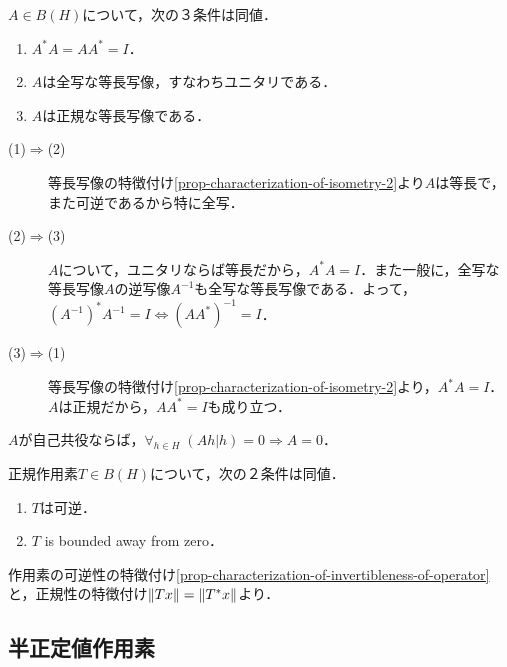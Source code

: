 \documentclass[uplatex,dvipdfmx]{jsreport}
\begin{document}
\begin{proposition}[同型の特徴付け]
    $A\in B(H)$について，次の３条件は同値．
    \begin{enumerate}
        \item $A^*A=AA^*=I$．
        \item $A$は全写な等長写像，すなわちユニタリである．
        \item $A$は正規な等長写像である．
    \end{enumerate}
\end{proposition}
\begin{Proof}\mbox{}
    \begin{description}
        \item[(1)$\Rightarrow$(2)] 等長写像の特徴付け\ref{prop-characterization-of-isometry-2}より$A$は等長で，また可逆であるから特に全写．
        \item[(2)$\Rightarrow$(3)] $A$について，ユニタリならば等長だから，$A^*A=I$．また一般に，全写な等長写像$A$の逆写像$A^{-1}$も全写な等長写像である．よって，$(A^{-1})^*A^{-1}=I\Leftrightarrow(AA^*)^{-1}=I$．
        \item[(3)$\Rightarrow$(1)] 等長写像の特徴付け\ref{prop-characterization-of-isometry-2}より，$A^*A=I$．$A$は正規だから，$AA^*=I$も成り立つ．
    \end{description}
\end{Proof}

\begin{corollary}
    $A$が自己共役ならば，$\forall_{h\in H}\;(Ah|h)=0\Rightarrow A=0$．
\end{corollary}

\begin{corollary}[正規作用素の可逆性]\label{prop-characterization-of-invertibleness-of-normal-operator}
    正規作用素$T\in B(H)$について，次の２条件は同値．
    \begin{enumerate}
        \item $T$は可逆．
        \item $T$ is bounded away from zero．
    \end{enumerate}
\end{corollary}
\begin{Proof}
    作用素の可逆性の特徴付け\ref{prop-characterization-of-invertibleness-of-operator}と，正規性の特徴付け$\|Tx\|=\|T^*x\|$より．
\end{Proof}

\subsection{半正定値作用素}
\end{document}
